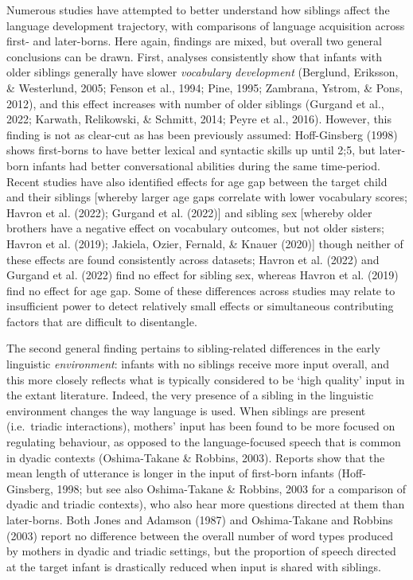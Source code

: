 \documentclass[
  man,mask,floatsintext]{apa6}
\begin{document}
Numerous studies have attempted to better understand how siblings affect the language development trajectory, with comparisons of language acquisition across first- and later-borns. Here again, findings are mixed, but overall two general conclusions can be drawn. First, analyses consistently show that infants with older siblings generally have slower \emph{vocabulary development} (Berglund, Eriksson, \& Westerlund, 2005; Fenson et al., 1994; Pine, 1995; Zambrana, Ystrom, \& Pons, 2012), and this effect increases with number of older siblings (Gurgand et al., 2022; Karwath, Relikowski, \& Schmitt, 2014; Peyre et al., 2016). However, this finding is not as clear-cut as has been previously assumed: Hoff-Ginsberg (1998) shows first-borns to have better lexical and syntactic skills up until 2;5, but later-born infants had better conversational abilities during the same time-period. Recent studies have also identified effects for age gap between the target child and their siblings {[}whereby larger age gaps correlate with lower vocabulary scores; Havron et al. (2022); Gurgand et al. (2022){]} and sibling sex {[}whereby older brothers have a negative effect on vocabulary outcomes, but not older sisters; Havron et al. (2019); Jakiela, Ozier, Fernald, \& Knauer (2020){]} though neither of these effects are found consistently across datasets; Havron et al. (2022) and Gurgand et al. (2022) find no effect for sibling sex, whereas Havron et al. (2019) find no effect for age gap. Some of these differences across studies may relate to insufficient power to detect relatively small effects or simultaneous contributing factors that are difficult to disentangle.

The second general finding pertains to sibling-related differences in the early linguistic \emph{environment}: infants with no siblings receive more input overall, and this more closely reflects what is typically considered to be `high quality' input in the extant literature. Indeed, the very presence of a sibling in the linguistic environment changes the way language is used. When siblings are present (i.e.~triadic interactions), mothers' input has been found to be more focused on regulating behaviour, as opposed to the language-focused speech that is common in dyadic contexts (Oshima-Takane \& Robbins, 2003). Reports show that the mean length of utterance is longer in the input of first-born infants (Hoff-Ginsberg, 1998; but see also Oshima-Takane \& Robbins, 2003 for a comparison of dyadic and triadic contexts), who also hear more questions directed at them than later-borns. Both Jones and Adamson (1987) and Oshima-Takane and Robbins (2003) report no difference between the overall number of word types produced by mothers in dyadic and triadic settings, but the proportion of speech directed at the target infant is drastically reduced when input is shared with siblings.
\end{document}
